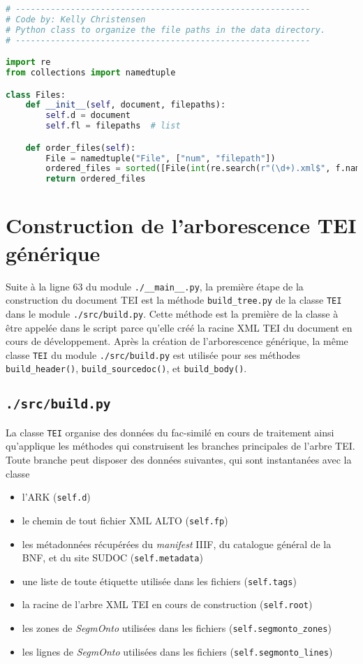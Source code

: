\documentclass[class=article, crop=false]{standalone}
\begin{document}
\begin{lstlisting}[language=python, style=python]
# -----------------------------------------------------------
# Code by: Kelly Christensen
# Python class to organize the file paths in the data directory.
# -----------------------------------------------------------

import re
from collections import namedtuple

class Files:
    def __init__(self, document, filepaths):
        self.d = document
        self.fl = filepaths  # list

    def order_files(self):
        File = namedtuple("File", ["num", "filepath"])
        ordered_files = sorted([File(int(re.search(r"(\d+).xml$", f.name).group(1)), f)for f in self.fl])
        return ordered_files
\end{lstlisting}

\section{Construction de l'arborescence \acrshort{TEI} générique}
Suite à la ligne 63 du module \texttt{./\_\_main\_\_.py}, la première étape de la construction du document \acrshort{TEI} est la méthode \texttt{build\_tree.py} de la classe \texttt{TEI} dans le module \texttt{./src/build.py}. Cette méthode est la première de la classe à être appelée dans le script parce qu'elle créé la racine \acrshort{XML} \acrshort{TEI} du document en cours de développement. Après la création de l'arborescence générique, la même classe \texttt{TEI} du module \texttt{./src/build.py} est utilisée pour ses méthodes \texttt{build\_header()}, \texttt{build\_sourcedoc()}, et \texttt{build\_body()}.

\subsection{\texttt{./src/build.py}}
La classe \texttt{TEI} organise des données du fac-similé en cours de traitement ainsi qu'applique les méthodes qui construisent les branches principales de l'arbre \acrshort{TEI}. Toute branche peut disposer des données suivantes, qui sont instantanées avec la classe
\begin{itemize}
\item l'\acrshort{ARK} (\texttt{self.d})
\item le chemin de tout fichier \acrshort{XML} \acrshort{ALTO} (\texttt{self.fp})
\item les métadonnées récupérées du \textit{manifest} \acrshort{IIIF}, du catalogue général de la \acrshort{BNF}, et du site \acrshort{SUDOC} (\texttt{self.metadata})
\item une liste de toute étiquette utilisée dans les fichiers (\texttt{self.tags})
\item la racine de l'arbre \acrshort{XML} \acrshort{TEI} en cours de construction (\texttt{self.root})
\item les zones de \textit{SegmOnto} utilisées dans les fichiers (\texttt{self.segmonto\_zones})
\item les lignes de \textit{SegmOnto} utilisées dans les fichiers (\texttt{self.segmonto\_lines})
\end{itemize}
\end{document}
